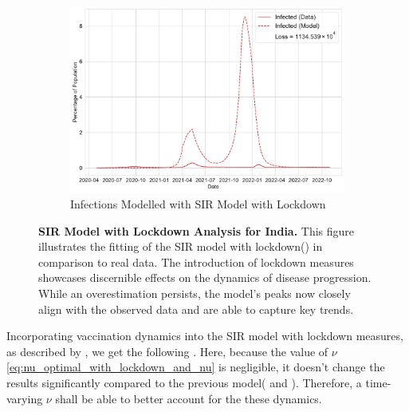 \documentclass[tikz,fleqn,12pt]{wlscirep}
\begin{document}
\begin{figure}[htbp!]\ContinuedFloat
  \begin{subfigure}[t]{\textwidth}
    \centering
    \includegraphics[scale=0.50]{images/SIR_model_with_lockdown_infections_IND.pdf}
    \caption{Infections Modelled with SIR Model with Lockdown}
    \label{fig:SIR_model_with_lockdown_infections_IND}
  \end{subfigure}
  \caption{\textbf{SIR Model with Lockdown Analysis for India.} This figure illustrates the fitting of the SIR model with lockdown() in comparison to real data. The introduction of lockdown measures showcases discernible effects on the dynamics of disease progression. While an overestimation persists, the model's peaks now closely align with the observed data and are able to capture key trends.}
\end{figure}

Incorporating vaccination dynamics into the SIR model with lockdown measures, as described by , we get the following . Here, because the value of $\nu$ \cref{eq:nu_optimal_with_lockdown_and_nu} is negligible, it doesn't change the results significantly compared to the previous model( and ). Therefore, a time-varying $\nu$ shall be able to better account for the these dynamics.
\end{document}
